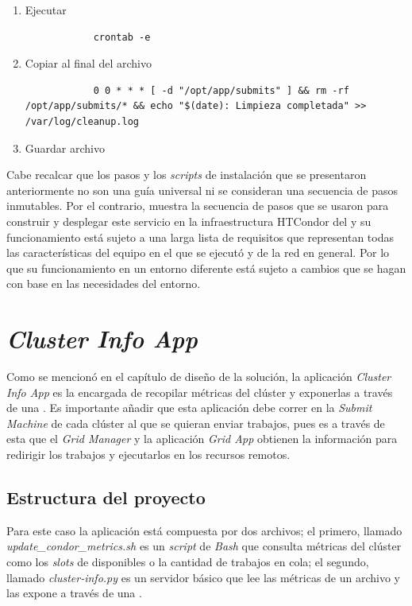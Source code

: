 \begin{enumerate}
	\item Ejecutar
		\begin{verbatim}
			crontab -e
		\end{verbatim}
	\item Copiar al final del archivo
		\begin{verbatim}
			0 0 * * * [ -d "/opt/app/submits" ] && rm -rf /opt/app/submits/* && echo "$(date): Limpieza completada" >> /var/log/cleanup.log
		\end{verbatim}
	\item Guardar archivo
\end{enumerate}

Cabe recalcar que los pasos y los \textit{scripts} de instalación que se presentaron anteriormente no son una guía universal ni se consideran una secuencia de pasos inmutables. Por el contrario, muestra la secuencia de pasos que se usaron para construir y desplegar este servicio en la infraestructura HTCondor del \GRID y su funcionamiento está sujeto a una larga lista de requisitos que representan todas las características del equipo en el que se ejecutó y de la red en general. Por lo que su funcionamiento en un entorno diferente está sujeto a cambios que se hagan con base en las necesidades del entorno.

\section{\textit{Cluster Info App}}
\noindent

Como se mencionó en el capítulo de diseño de la solución, la aplicación \textit{Cluster Info App} es la encargada de recopilar métricas del clúster y exponerlas a través de una \API. Es importante añadir que esta aplicación debe correr en la \textit{Submit Machine} de cada clúster al que se quieran enviar trabajos, pues es a través de esta que el \textit{Grid Manager} y la aplicación \textit{Grid App} obtienen la información para redirigir los trabajos y ejecutarlos en los recursos remotos.

\subsection{Estructura del proyecto}
\noindent
Para este caso la aplicación está compuesta por dos archivos; el primero, llamado \textit{update\_condor\_metrics.sh} es un \textit{script} de \textit{Bash} que consulta métricas del clúster como los \textit{slots} de \CPU disponibles o la cantidad de trabajos en cola; el segundo, llamado \textit{cluster-info.py} es un servidor \HTTP básico que lee las métricas de un archivo y las expone a través de una \API.

